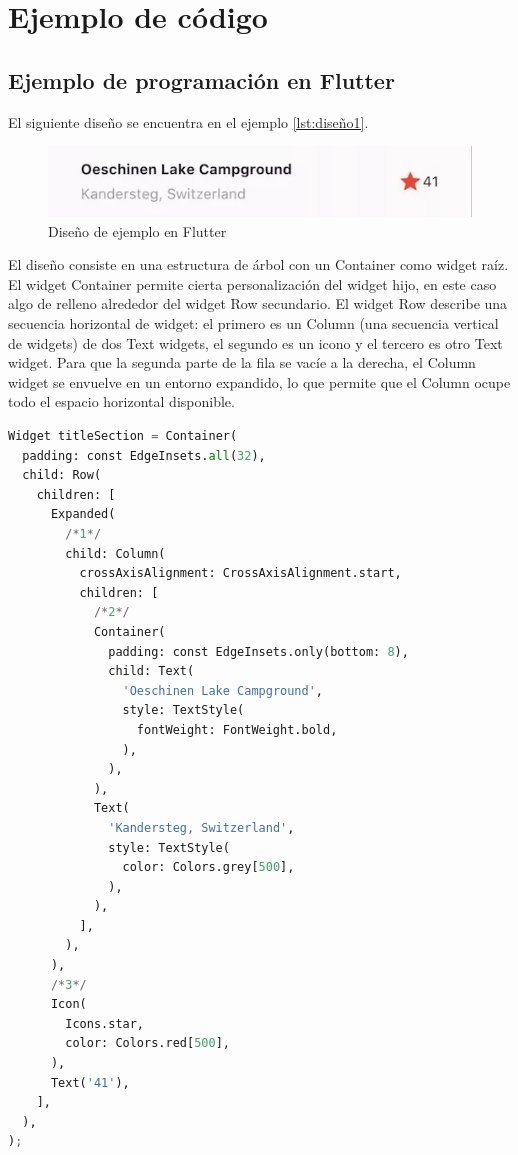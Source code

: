 \newpage
\appendix
\chapter*{Ejemplo de código} \label{aped.A}
\section*{Ejemplo de programación en Flutter}
El siguiente diseño se encuentra en el ejemplo \ref{lst:diseño1}.
\newline

\begin{figure}[!ht]
    \centering
    \includegraphics[scale = 0.9]{img/apendices/layaout.jpg}
    \caption{Diseño de ejemplo en Flutter}
    \label{fig:my_label}
\end{figure}


El diseño consiste en una estructura de árbol con un Container como widget raíz. El widget Container permite cierta personalización del widget hijo, en este caso algo de relleno alrededor del widget Row secundario. El widget Row describe una secuencia horizontal de widget: el primero es un Column (una secuencia vertical de widgets) de dos Text widgets, el segundo es un icono y el tercero es otro Text widget. Para que la segunda parte de la fila se vacíe a la derecha, el Column widget se envuelve en un entorno expandido, lo que permite que el Column ocupe todo el espacio horizontal disponible.
\newline
\begin{lstlisting}[language=Python, caption=Código de diseño de ejemplo, label={lst:diseño1}]
Widget titleSection = Container(
  padding: const EdgeInsets.all(32),
  child: Row(
    children: [
      Expanded(
        /*1*/
        child: Column(
          crossAxisAlignment: CrossAxisAlignment.start,
          children: [
            /*2*/
            Container(
              padding: const EdgeInsets.only(bottom: 8),
              child: Text(
                'Oeschinen Lake Campground',
                style: TextStyle(
                  fontWeight: FontWeight.bold,
                ),
              ),
            ),
            Text(
              'Kandersteg, Switzerland',
              style: TextStyle(
                color: Colors.grey[500],
              ),
            ),
          ],
        ),
      ),
      /*3*/
      Icon(
        Icons.star,
        color: Colors.red[500],
      ),
      Text('41'),
    ],
  ),
);

\end{lstlisting}

%
%

\clearpage